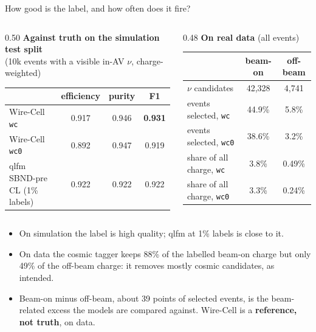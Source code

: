 \documentclass[aspectratio=169,10pt]{beamer}
\newcommand{\code}[1]{\texttt{#1}}
\begin{document}
\begin{frame}{How good is the label, and how often does it fire?}
  \footnotesize
  \begin{columns}[T]
    \begin{column}{0.50\textwidth}
      \centering
      \scriptsize
      \textbf{Against truth on the simulation test split}\\(10k events with a visible in-AV $\nu$, charge-weighted)\\[3pt]
      \begin{tabular}{lccc}
        \toprule
        & efficiency & purity & F1 \\
        \midrule
        Wire-Cell \code{wc} & 0.917 & 0.946 & \textbf{0.931} \\
        Wire-Cell \code{wc0} & 0.892 & 0.947 & 0.919 \\
        qlfm SBND-pre CL (1\% labels) & 0.922 & 0.922 & 0.922 \\
        \bottomrule
      \end{tabular}
    \end{column}
    \begin{column}{0.48\textwidth}
      \centering
      \scriptsize
      \textbf{On real data} (all events)\\[3pt]
      \begin{tabular}{lcc}
        \toprule
        & beam-on & off-beam \\
        \midrule
        $\nu$ candidates & 42,328 & 4,741 \\
        events selected, \code{wc} & 44.9\% & 5.8\% \\
        events selected, \code{wc0} & 38.6\% & 3.2\% \\
        share of all charge, \code{wc} & 3.8\% & 0.49\% \\
        share of all charge, \code{wc0} & 3.3\% & 0.24\% \\
        \bottomrule
      \end{tabular}
    \end{column}
  \end{columns}
  \vspace{8pt}
  \begin{itemize}\setlength{\itemsep}{3pt}
    \item On simulation the label is high quality; qlfm at 1\% labels is close to it.
    \item On data the cosmic tagger keeps 88\% of the labelled beam-on charge but only 49\% of the off-beam charge: it removes
      mostly cosmic candidates, as intended.
    \item Beam-on minus off-beam, about 39 points of selected events, is the beam-related excess the models are compared against.
      Wire-Cell is a \textbf{reference, not truth}, on data.
  \end{itemize}
\end{frame}
\end{document}
